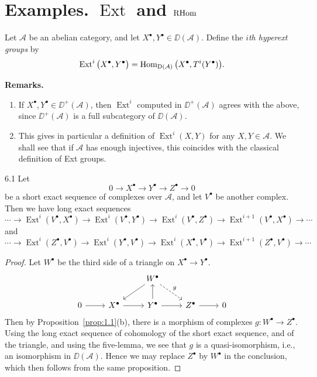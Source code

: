 \section{Examples. $\operatorname{Ext}$ and $\operatorname{RHom}$}\label{sec:1.6}

\begin{definition*}
Let $\mathcal{A}$ be an abelian category, and let $X^\bullet,Y^\bullet\in\DD(\mathcal{A})$.
Define the \emph{$i$th hyperext groups} by
\[
\operatorname{Ext}^i\big(X^\bullet,Y^\bullet\big)
= \operatorname{Hom}_{\operatorname{D}(\mathcal{A})}\big(X^\bullet, T^i(Y^\bullet)\big).
\]
\end{definition*}

\textbf{Remarks.}
\begin{enumerate}
\item If $X^\bullet,Y^\bullet\in\DD^+(\mathcal{A})$, then $\operatorname{Ext}^i$ computed in $\DD^+(\mathcal{A})$
agrees with the above, since $\DD^+(\mathcal{A})$ is a full subcategory of $\DD(\mathcal{A})$.

\item This gives in particular a definition of  $\operatorname{Ext}^i(X,Y)$ for any $X,Y\in\mathcal{A}$.
We shall see that if $\mathcal{A}$ has enough injectives, this coincides with the classical
definition of Ext groups.
\end{enumerate}

\begin{bookproposition}{6.1}\label{prop:1.6.1}
Let
\[
0 \to X^\bullet \to Y^\bullet \to Z^\bullet \to 0
\]
be a short exact sequence of complexes over $\mathcal{A}$, and let $V^\bullet$ be another complex.
Then we have long exact sequences
\[
\cdots \to \operatorname{Ext}^i(V^\bullet,X^\bullet)
\to \operatorname{Ext}^i(V^\bullet,Y^\bullet)
\to \operatorname{Ext}^i(V^\bullet,Z^\bullet)
\to \operatorname{Ext}^{i+1}(V^\bullet,X^\bullet)
\to \cdots
\]
and
\[
\cdots \to \operatorname{Ext}^i(Z^\bullet,V^\bullet)
\to \operatorname{Ext}^i(Y^\bullet,V^\bullet)
\to \operatorname{Ext}^i(X^\bullet,V^\bullet)
\to \operatorname{Ext}^{i+1}(Z^\bullet,V^\bullet)
\to \cdots
\]
\end{bookproposition}

\begin{proof}
Let $W^\bullet$ be the third side of a triangle on $X^\bullet \to Y^\bullet$.
\[
\begin{tikzcd}
	& & W^\bullet \arrow[ld] \arrow[rd, dashed, "g"] & \\
	0 \arrow[r] & X^\bullet \arrow[r] & Y^\bullet \arrow[u] \arrow[r] & Z^\bullet \arrow[r] & 0
\end{tikzcd}
\]
Then by Proposition~\ref{prop:1.1}(b), there is a morphism of complexes $g\colon W^\bullet \to Z^\bullet$. Using the long exact sequence of cohomology of the short exact sequence, and of the triangle, and using the five-lemma, we see that $g$ is a quasi-isomorphism, i.e., an isomorphism in $\DD(\mathcal{A})$. Hence we may replace $Z^\bullet$ by $W^\bullet$ in the conclusion, which then follows from the same proposition.
\end{proof}

